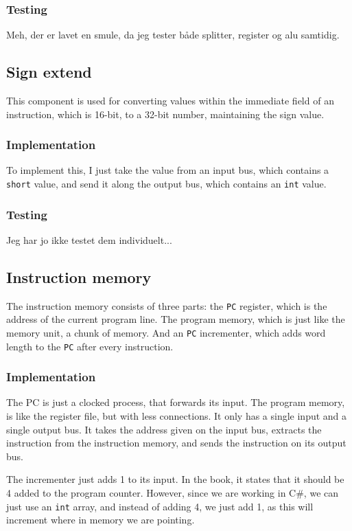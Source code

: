 \subsubsection*{Testing}
Meh, der er lavet en smule, da jeg tester både splitter, register og alu
samtidig.

\subsection{Sign extend}
This component is used for converting values within the immediate field of an
instruction, which is 16-bit, to a 32-bit number, maintaining the sign value.

\subsubsection*{Implementation}
To implement this, I just take the value from an input bus, which contains a
\texttt{short} value, and send it along the output bus, which contains an
\texttt{int} value.

\subsubsection*{Testing}
Jeg har jo ikke testet dem individuelt...

\subsection{Instruction memory}
The instruction memory consists of three parts: the \texttt{PC} register, which
is the address of the current program line. The program memory, which is just
like the memory unit, a chunk of memory. And an \texttt{PC} incrementer, which
adds word length to the \texttt{PC} after every instruction.

\subsubsection*{Implementation}
The PC is just a clocked process, that forwards its input. The program memory,
is like the register file, but with less connections. It only has a single
input and a single output bus. It takes the address given on the input bus,
extracts the instruction from the instruction memory, and sends the instruction
on its output bus.

The incrementer just adds 1 to its input. In the book, it states that it should
be 4 added to the program counter. However, since we are working in C\#, we can
just use an \texttt{int} array, and instead of adding 4, we just add 1, as this
will increment where in memory we are pointing.

